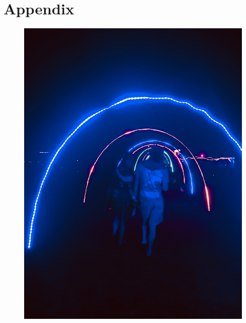 \appendix
\addappheadtotoc
\chapter[Appendix]{Appendix}
\ifisflight
\fi

\printglossaries


\ifisflight
\vspace*{\fill}
\begin{figure}[!h]
\centering
\includegraphics[width=.8\textwidth]{images/TTM2017tunnel.jpeg}
\end{figure}
\vspace*{\fill}



\fi



